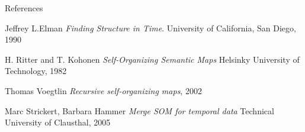 \documentclass[10pt]{beamer}
\begin{document}
\appendix


\begin{frame}[allowframebreaks]{References}

  
  
\begin{thebibliography}{9}
Jeffrey L.Elman
\textit{Finding Structure in Time}. 
University of California, San Diego, 1990
 
H. Ritter and T. Kohonen
\textit{Self-Organizing Semantic Maps} 
Helsinky University of Technology, 1982
  
Thomas Voegtlin
\textit{Recursive self-organizing maps}, 2002
 
Marc Strickert, Barbara Hammer
\textit{Merge SOM for temporal data}
Technical University of Clausthal, 2005
 
\end{thebibliography}

\end{frame}
\end{document}
